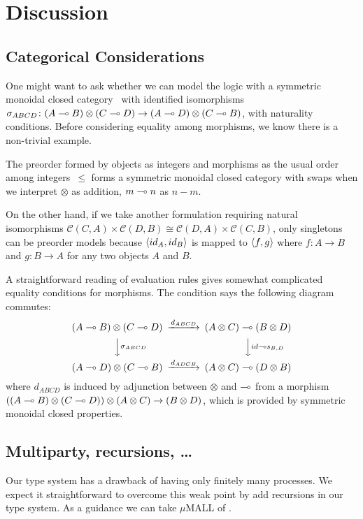 \section{Discussion}

\subsection{Categorical Considerations}
One might want to ask whether we can model the logic with
a symmetric monoidal closed category~\citep{blute2004category}
  with identified isomorphisms
$\sigma_{ABCD}\colon (A\multimap B)\otimes (C\multimap D)\rightarrow (A\multimap D) \otimes
 (C\multimap B)$, with naturality conditions.
 Before considering equality among morphisms,
 we know there is a non-trivial example.
  \begin{example}
   \label{smcc}
   The preorder formed by objects as integers and morphisms as the usual
   order among integers~$\le$
   forms a symmetric monoidal closed category with swaps
   when we interpret $\otimes$ as addition,
   $m \multimap n$ as $n-m$.
  \end{example}
  On the other hand,
  if we take another formulation requiring natural isomorphisms
  $\mathcal C(C,A)\times\mathcal C(D,B) \cong \mathcal C(D,A)\times
  \mathcal C{(C,B)}$,
  only singletons can be preorder models because $\langle{id_A,id_B}\rangle$ is
  mapped to $\langle{f,g}\rangle$ where $f\colon A\rightarrow B$ and $g\colon
  B\rightarrow A$ for any two objects $A$ and $B$.

A straightforward reading of evaluation rules gives somewhat complicated
equality conditions for morphisms.
The condition says the following diagram commutes:
\[
   \begin{CD}
    (A\limp B)\otimes (C\limp D) @>{d_{ABCD}}>> (A\otimes C)\limp(B\otimes D)\\
    @VV{\sigma_{ABCD}}V @VV{id\limp s_{B,D}}V\\
    (A\limp D)\otimes (C\limp B) @>{d_{ADCB}}>> (A\otimes C)\limp (D\otimes B)
   \end{CD}
\]
where $d_{ABCD}$ is induced by adjunction between $\otimes$ and $\multimap$
 from a morphism
 $((A\multimap B)\otimes (C\multimap D))\otimes (A\otimes C)\rightarrow
 (B\otimes D)$, which is provided by symmetric monoidal closed
 properties.

\subsection{Multiparty, recursions, \ldots}
Our type system has a drawback of having only finitely many processes.
We expect it straightforward to overcome this weak point by
add recursions in our type system.
As a guidance we can take $\mu$MALL of \citet{mumall}.

